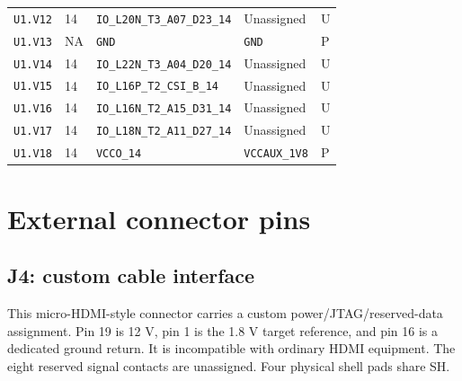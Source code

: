\documentclass[11pt,a4paper]{article}
\begin{document}
\begin{longtable}{@{}P{20mm}P{10mm}P{75mm}P{49mm}P{7mm}@{}}
\nolinkurl{U1.V12} & 14 & \nolinkurl{IO_L20N_T3_A07_D23_14} & Unassigned & U \\
\nolinkurl{U1.V13} & NA & \nolinkurl{GND} & \nolinkurl{GND} & P \\
\nolinkurl{U1.V14} & 14 & \nolinkurl{IO_L22N_T3_A04_D20_14} & Unassigned & U \\
\nolinkurl{U1.V15} & 14 & \nolinkurl{IO_L16P_T2_CSI_B_14} & Unassigned & U \\
\nolinkurl{U1.V16} & 14 & \nolinkurl{IO_L16N_T2_A15_D31_14} & Unassigned & U \\
\nolinkurl{U1.V17} & 14 & \nolinkurl{IO_L18N_T2_A11_D27_14} & Unassigned & U \\
\nolinkurl{U1.V18} & 14 & \nolinkurl{VCCO_14} & \nolinkurl{VCCAUX_1V8} & P \\
\end{longtable}\endgroup

\clearpage\section{External connector pins}\subsection{J4: custom cable interface}
This micro-HDMI-style connector carries a custom power/JTAG/reserved-data assignment. Pin 19 is 12 V, pin 1 is the 1.8 V target reference, and pin 16 is a dedicated ground return. It is incompatible with ordinary HDMI equipment. The eight reserved signal contacts are unassigned. Four physical shell pads share SH.
\end{document}
